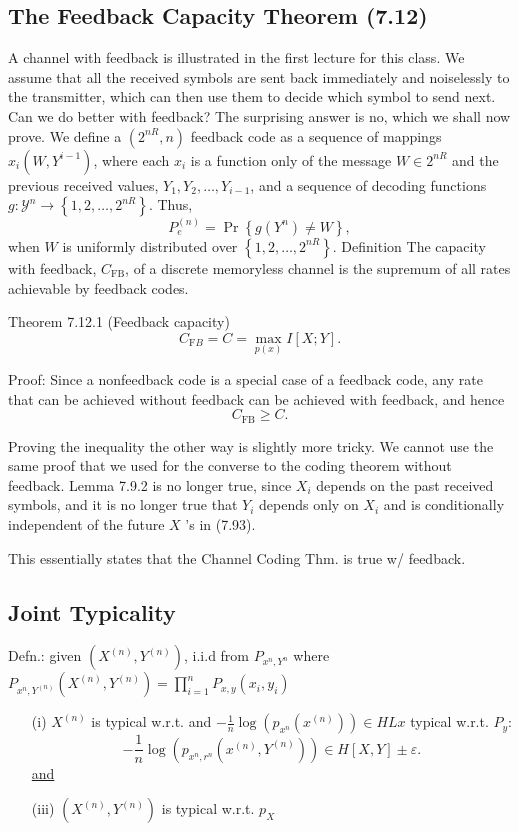 \subsection{The Feedback Capacity Theorem (7.12)}
A channel with feedback is illustrated in the first lecture for this class. We assume that all the received symbols are sent back immediately and noiselessly to the transmitter, which can then use them to decide which symbol to send next. Can we do better with feedback? The surprising answer is no, which we shall now prove. We define a $\left(2^{n R}, n\right)$ feedback code as a sequence of mappings $x_i\left(W, Y^{i-1}\right)$, where each $x_i$ is a function only of the message $W \in 2^{n R}$ and the previous received values, $Y_1, Y_2, \ldots, Y_{i-1}$, and a sequence of decoding functions $g: \mathcal{Y}^n \rightarrow\left\{1,2, \ldots, 2^{n R}\right\}$. Thus,
$$
P_e^{(n)}=\operatorname{Pr}\left\{g\left(Y^n\right) \neq W\right\},
$$
when $W$ is uniformly distributed over $\left\{1,2, \ldots, 2^{n R}\right\}$.
Definition The capacity with feedback, $C_{\mathrm{FB}}$, of a discrete memoryless channel is the supremum of all rates achievable by feedback codes.

Theorem 7.12.1 (Feedback capacity)
$$
C_{\mathrm{F} B}=C=\max _{p(x)} I\left[X ; Y\right].
$$

\begin{Answer}
Proof: Since a nonfeedback code is a special case of a feedback code, any rate that can be achieved without feedback can be achieved with feedback, and hence
$$
C_{\mathrm{FB}} \geq C.
$$

Proving the inequality the other way is slightly more tricky. We cannot use the same proof that we used for the converse to the coding theorem without feedback. Lemma 7.9.2 is no longer true, since $X_i$ depends on the past received symbols, and it is no longer true that $Y_i$ depends only on $X_i$ and is conditionally independent of the future $X$ 's in (7.93).
\end{Answer}

This essentially states that the Channel Coding Thm. is true w/ feedback.

\subsection{Joint Typicality}
Defn.: given $\left(X^{(n)}, Y^{(n)}\right)$, i.i.d from $P_{x^n, Y^n}$ where $P_{x^n, Y^{(n)}}\left(X^{(n)}, Y^{(n)}\right)=\prod_{i=1}^n P_{x, y}\left(x_i, y_i\right)$
\begin{enumerate}
    \item[(i)] $X^{(n)}$ is typical w.r.t.
and $-\frac{1}{n} \log \left(p_{x^n}\left(x^{(n)}\right)\right) \in H L x$ typical w.r.t. $P_y$:
$$
-\frac{1}{n} \log \left(p_{x^n, r^n}\left(x^{(n)}, Y^{(n)}\right)\right) \in H[X, Y] \pm \varepsilon .
$$
\underline{and}
    \item[(iii)] $\left(X^{(n)}, Y^{(n)}\right)$ is typical w.r.t. $p_X$
\end{enumerate}

